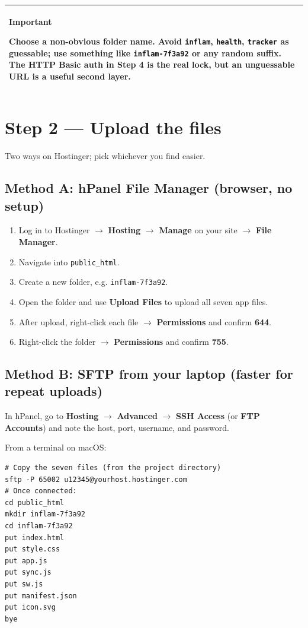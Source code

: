 \documentclass[11pt,a4paper]{article}
\newcommand{\callout}[3]{%
  \begin{center}%
  \begin{tabularx}{\linewidth}{|>{\columncolor{#1}}X|}%
  \hline
  \textbf{#2}\par\smallskip #3\\[2pt]
  \hline
  \end{tabularx}%
  \end{center}%
}
\newcommand{\warnbox}[1]{\callout{warnbg}{Important}{#1}}
\begin{document}
\warnbox{Choose a non-obvious folder name. Avoid \texttt{inflam}, \texttt{health}, \texttt{tracker} as guessable; use something like \texttt{inflam-7f3a92} or any random suffix. The HTTP Basic auth in Step 4 is the real lock, but an unguessable URL is a useful second layer.}

\section{Step 2 --- Upload the files}

Two ways on Hostinger; pick whichever you find easier.

\subsection{Method A: hPanel File Manager (browser, no setup)}

\begin{enumerate}[leftmargin=*]
  \item Log in to Hostinger $\rightarrow$ \textbf{Hosting} $\rightarrow$ \textbf{Manage} on your site $\rightarrow$ \textbf{File Manager}.
  \item Navigate into \texttt{public\_html}.
  \item Create a new folder, e.g. \texttt{inflam-7f3a92}.
  \item Open the folder and use \textbf{Upload Files} to upload all seven app files.
  \item After upload, right-click each file $\rightarrow$ \textbf{Permissions} and confirm \textbf{644}.
  \item Right-click the folder $\rightarrow$ \textbf{Permissions} and confirm \textbf{755}.
\end{enumerate}

\subsection{Method B: SFTP from your laptop (faster for repeat uploads)}

In hPanel, go to \textbf{Hosting} $\rightarrow$ \textbf{Advanced} $\rightarrow$ \textbf{SSH Access} (or \textbf{FTP Accounts}) and note the host, port, username, and password.

From a terminal on macOS:

\begin{lstlisting}[language=shell]
# Copy the seven files (from the project directory)
sftp -P 65002 u12345@yourhost.hostinger.com
# Once connected:
cd public_html
mkdir inflam-7f3a92
cd inflam-7f3a92
put index.html
put style.css
put app.js
put sync.js
put sw.js
put manifest.json
put icon.svg
bye
\end{lstlisting}
\end{document}
